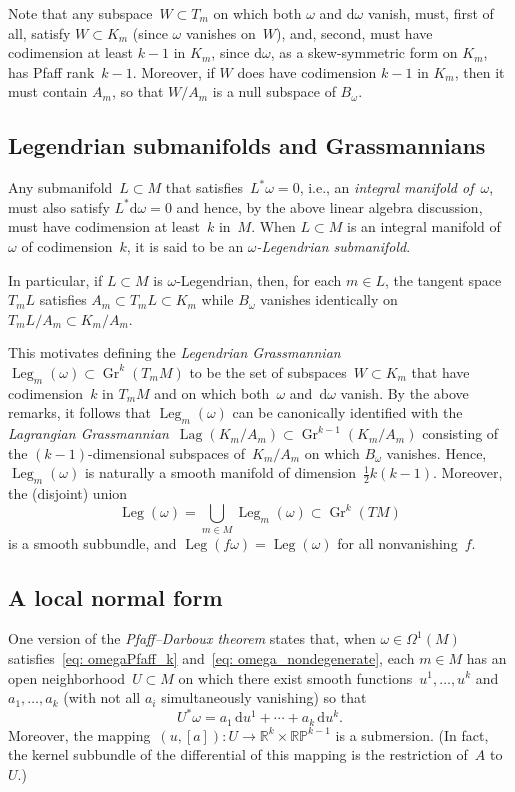 \documentclass[11pt]{article}
\numberwithin{equation}{section}
\renewcommand{\d}{\mathrm{d}}%
\newcommand{\bbR}{{\mathbb R}}
\newcommand{\Gr}{\operatorname{Gr}}
\newcommand{\Leg}{\operatorname{Leg}}
\newcommand{\Lag}{\operatorname{Lag}}
\numberwithin{equation}{section}
\begin{document}
Note that any subspace~$W\subset T_m$ on which both $\omega$ and $\d\omega$
vanish, must, first of all, satisfy $W\subset K_m$
(since $\omega$ vanishes on~$W$), and, second, must have codimension
at least $k{-}1$ in $K_m$, since $\d\omega$, as a skew-symmetric form
on $K_m$, has Pfaff rank~$k{-}1$.
Moreover, if $W$ does have codimension $k{-}1$ in $K_m$,
then it must contain $A_m$, so that $W/A_m$ is a null subspace of $B_\omega$.

\subsection{Legendrian submanifolds and Grassmannians}
Any submanifold~$L\subset M$ that satisfies~$L^*\omega=0$,
i.e., an \emph{integral manifold of~$\omega$},
must also satisfy $L^*\d\omega=0$
and hence, by the above linear algebra discussion,
must have codimension at least~$k$ in~$M$.
When $L\subset M$ is an integral manifold of~$\omega$ of codimension~$k$,
it is said to be an \emph{$\omega$-Legendrian submanifold}.

In particular, if $L\subset M$ is $\omega$-Legendrian,
then, for each $m\in L$, the tangent space $T_mL$
satisfies $A_m\subset T_mL\subset K_m$
while $B_\omega$ vanishes identically on $T_mL/A_m\subset K_m/A_m$.

This motivates defining
the \emph{Legendrian Grassmannian}~$\Leg_m(\omega)\subset\Gr^k(T_mM)$
to be the set of subspaces~$W\subset K_m$
that have codimension~$k$ in $T_mM$
and on which both~$\omega$ and~$\d\omega$ vanish.
By the above remarks, it follows that $\Leg_m(\omega)$
can be canonically identified with the
\emph{Lagrangian Grassmannian}~$\Lag(K_m/A_m)\subset\Gr^{k-1}(K_m/A_m)$
consisting of the $(k{-}1)$-dimensional subspaces of~$K_m/A_m$
on which $B_\omega$ vanishes.
Hence, $\Leg_m(\omega)$ is naturally a smooth manifold
of dimension~$\tfrac12k(k{-}1)$.
Moreover, the (disjoint) union
\[
\Leg(\omega) = \bigcup_{m\in M} \Leg_m(\omega)\subset \Gr^k(TM)
\]
is a smooth subbundle,
and $\Leg(f\omega)=\Leg(\omega)$ for all nonvanishing~$f$.

\subsection{A local normal form}
One version of the \emph{Pfaff--Darboux theorem}
\cite[Chapter II, Theorem~3.1]{MR1083148} states that,
when ${\omega\in\Omega^1(M)}$ satisfies~\eqref{eq: omegaPfaff_k}
and~\eqref{eq: omega_nondegenerate},
each $m\in M$
has an open neighborhood~$U\subset M$
on which there exist smooth functions~$u^1,\ldots,u^k$
and $a_1,\ldots,a_k$ (with not all $a_i$ simultaneously vanishing)
so that
\begin{equation}\label{eq: PfaffDarboux_normalform}
U^*\omega = a_1\,\d u^1 + \cdots + a_k\,\d u^k .
\end{equation}
Moreover,
the mapping~$(u,[a])\colon U\to\bbR^k\times\mathbb{RP}^{k-1}$
is a submersion. (In fact, the kernel subbundle of the differential
of this mapping is the restriction of~$A$ to~$U$.)
\end{document}
